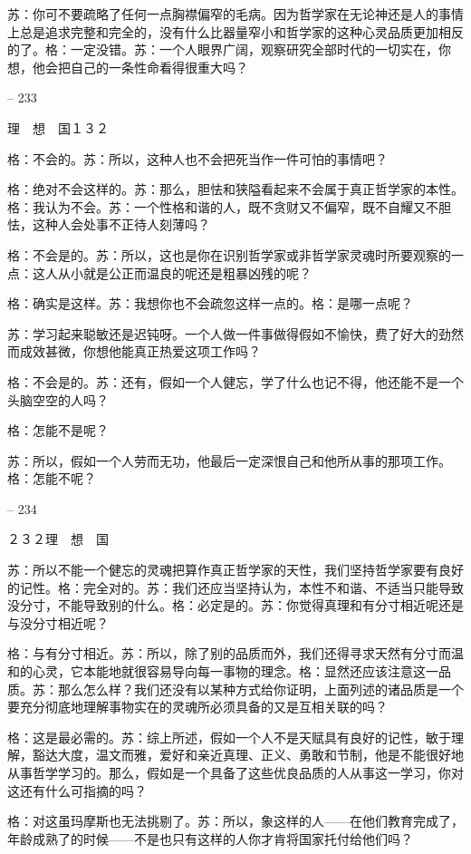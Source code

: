 \documentclass[11pt,oneside]{book}
\begin{document}
\begin{common-format}
    苏：你可不要疏略了任何一点胸襟偏窄的毛病。因为哲学家在无论神还是人的事情上总是追求完整和完全的，没有什么比器量窄小和哲学家的这种心灵品质更加相反的了。格：一定没错。苏：一个人眼界广阔，观察研究全部时代的一切实在，你想，他会把自己的一条性命看得很重大吗？

    

-- 233

    理　想　国１３２

    格：不会的。苏：所以，这种人也不会把死当作一件可怕的事情吧？

    格：绝对不会这样的。苏：那么，胆怯和狭隘看起来不会属于真正哲学家的本性。格：我认为不会。苏：一个性格和谐的人，既不贪财又不偏窄，既不自耀又不胆怯，这种人会处事不正待人刻薄吗？

    格：不会是的。苏：所以，这也是你在识别哲学家或非哲学家灵魂时所要观察的一点：这人从小就是公正而温良的呢还是粗暴凶残的呢？

    格：确实是这样。苏：我想你也不会疏忽这样一点的。格：是哪一点呢？

    苏：学习起来聪敏还是迟钝呀。一个人做一件事做得假如不愉快，费了好大的劲然而成效甚微，你想他能真正热爱这项工作吗？

    格：不会是的。苏：还有，假如一个人健忘，学了什么也记不得，他还能不是一个头脑空空的人吗？

    格：怎能不是呢？

    苏：所以，假如一个人劳而无功，他最后一定深恨自己和他所从事的那项工作。格：怎能不呢？

    

-- 234

    ２３２理　想　国

    苏：所以不能一个健忘的灵魂把算作真正哲学家的天性，我们坚持哲学家要有良好的记性。格：完全对的。苏：我们还应当坚持认为，本性不和谐、不适当只能导致没分寸，不能导致别的什么。格：必定是的。苏：你觉得真理和有分寸相近呢还是与没分寸相近呢？

    格：与有分寸相近。苏：所以，除了别的品质而外，我们还得寻求天然有分寸而温和的心灵，它本能地就很容易导向每一事物的理念。格：显然还应该注意这一品质。苏：那么怎么样？我们还没有以某种方式给你证明，上面列述的诸品质是一个要充分彻底地理解事物实在的灵魂所必须具备的又是互相关联的吗？

    格：这是最必需的。苏：综上所述，假如一个人不是天赋具有良好的记性，敏于理解，豁达大度，温文而雅，爱好和亲近真理、正义、勇敢和节制，他是不能很好地从事哲学学习的。那么，假如是一个具备了这些优良品质的人从事这一学习，你对这还有什么可指摘的吗？

    格：对这虽玛摩斯也无法挑剔了。苏：所以，象这样的人——在他们教育完成了，年龄成熟了的时候——不是也只有这样的人你才肯将国家托付给他们吗？


\end{common-format}
\end{document}
